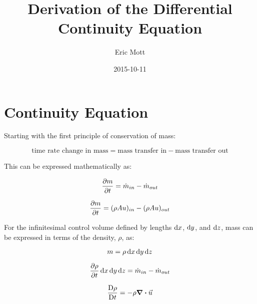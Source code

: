 \documentclass[11pt, oneside]{article}   	%
\title{Derivation of the Differential Continuity Equation}
\author{Eric Mott}
\date{2015-10-11}					%
\begin{document}
\maketitle 							%


\section{Continuity Equation}			%

\begin{figure}
\centering
{}
\end{figure}

Starting with the first principle of conservation of mass:

\begin{equation}
\text{time rate change in mass} = \text{mass transfer in} - \text{mass transfer out}
\end{equation}

\noindent 
This can be expressed mathematically as:

\begin{equation}
\pdv{m}{t} = \dot{m}_{in} - \dot{m}_{out}
\end{equation}

\begin{equation}
\pdv{m}{t} = (\rho A u)_{in} - (\rho A u)_{out}
\end{equation}

\noindent
For the infinitesimal control volume defined by lengths $\dif x$, $\dif y$, and $\dif z$, mass can be expressed in terms of the density, $\rho$, as:

\begin{equation}
m = \rho \dif x \dif y \dif z
\end{equation}

\begin{equation}
\pdv{\rho}{t} \dif x \dif y \dif z = \dot{m}_{in} - \dot{m}_{out}
\end{equation}

\begin{equation}
\frac{\Dif \rho}{\Dif t}   = - \rho \div \vec{u}
\end{equation}
\end{document}
